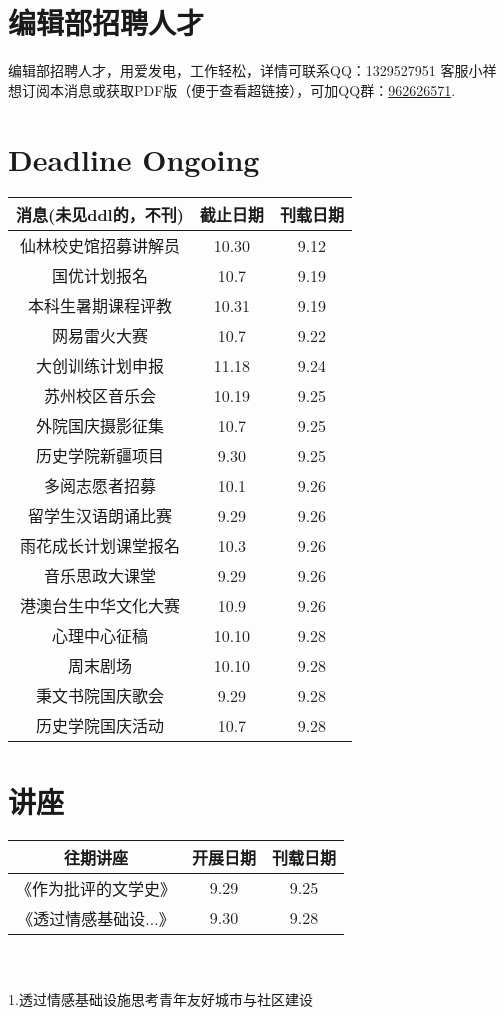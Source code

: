 \documentclass[letterpaper, 12pt]{article}
\begin{document}
\begin{multicols}{2}
\section{编辑部招聘人才}
编辑部招聘人才，用爱发电，工作轻松，详情可联系QQ：1329527951 客服小祥\\想订阅本消息或获取PDF版（便于查看超链接），可加QQ群：\href{https://qm.qq.com/q/FGX1VYCrGS}{962626571}.
\section{Deadline Ongoing}
\begin{tabular}{|c|c|c|}
    \hline
    消息(未见ddl的，不刊) & 截止日期 & 刊载日期\\
    \hline\hline
    仙林校史馆招募讲解员 & 10.30 & 9.12\\
    国优计划报名 & 10.7 & 9.19\\
    本科生暑期课程评教 & 10.31 & 9.19\\
    网易雷火大赛 & 10.7 & 9.22\\
    大创训练计划申报 & 11.18 & 9.24\\
    苏州校区音乐会 & 10.19 & 9.25\\
    外院国庆摄影征集 & 10.7 & 9.25\\
    历史学院新疆项目 & 9.30 & 9.25\\
    多阅志愿者招募 & 10.1 & 9.26\\
    留学生汉语朗诵比赛 & 9.29 & 9.26\\
    雨花成长计划课堂报名 & 10.3 & 9.26\\
    音乐思政大课堂 & 9.29 & 9.26\\
    港澳台生中华文化大赛 & 10.9 & 9.26\\
    心理中心征稿 & 10.10 & 9.28\\
    周末剧场 & 10.10 & 9.28\\
    秉文书院国庆歌会 & 9.29 & 9.28\\
    历史学院国庆活动 & 10.7 & 9.28\\
    \hline
\end{tabular}

\section{讲座}
\begin{tabular}{|c|c|c|}
    \hline
    往期讲座 & 开展日期 & 刊载日期\\
    \hline\hline
   《作为批评的文学史》 & 9.29 & 9.25\\
   《透过情感基础设...》 & 9.30 & 9.28\\
      \hline
\end{tabular}\\\\
1.透过情感基础设施思考青年友好城市与社区建设


\end{multicols}
\end{document}
